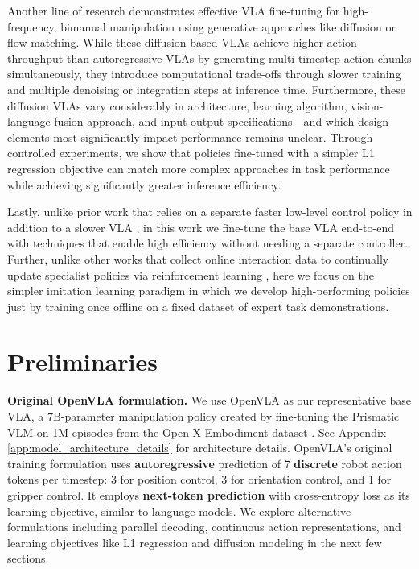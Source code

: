 \documentclass[conference]{IEEEtran}
\begin{document}
Another line of research \citep{wen2024tinyvla, liu2024rdt, black2024pi_0} demonstrates effective VLA fine-tuning for high-frequency, bimanual manipulation using generative approaches like diffusion or flow matching. While these diffusion-based VLAs achieve higher action throughput than autoregressive VLAs by generating multi-timestep action chunks simultaneously, they introduce computational trade-offs through slower training and multiple denoising or integration steps at inference time. Furthermore, these diffusion VLAs vary considerably in architecture, learning algorithm, vision-language fusion approach, and input-output specifications---and which design elements most significantly impact performance remains unclear. Through controlled experiments, we show that policies fine-tuned with a simpler L1 regression objective can match more complex approaches in task performance while achieving significantly greater inference efficiency.

Lastly, unlike prior work that relies on a separate faster low-level control policy in addition to a slower VLA \citep{pan2024vision}, in this work we fine-tune the base VLA end-to-end with techniques that enable high efficiency without needing a separate controller. Further, unlike other works that collect online interaction data to continually update specialist policies via reinforcement learning \citep{julg2025refined}, here we focus on the simpler imitation learning paradigm in which we develop high-performing policies just by training once offline on a fixed dataset of expert task demonstrations.

\section{Preliminaries}
\label{sec:preliminaries}

\textbf{Original OpenVLA formulation.} We use OpenVLA \citep{kim2024openvla} as our representative base VLA, a 7B-parameter manipulation policy created by fine-tuning the Prismatic VLM \citep{karamcheti2024prismatic} on 1M episodes from the Open X-Embodiment dataset \citep{o2023open}. See Appendix \ref{app:model_architecture_details} for architecture details. OpenVLA's original training formulation uses \textbf{autoregressive} prediction of 7 \textbf{discrete} robot action tokens per timestep: 3 for position control, 3 for orientation control, and 1 for gripper control. It employs \textbf{next-token prediction} with cross-entropy loss as its learning objective, similar to language models. We explore alternative formulations including parallel decoding, continuous action representations, and learning objectives like L1 regression and diffusion modeling in the next few sections.
\end{document}
